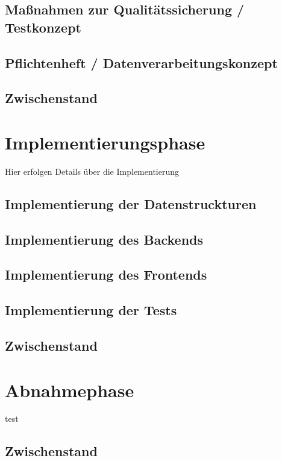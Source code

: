 \documentclass[12pt, xcolor=dvipsnames]{scrartcl}
\begin{document}
\subsection{Maßnahmen zur Qualitätssicherung / Testkonzept}

\subsection{Pflichtenheft / Datenverarbeitungskonzept}

\subsection{Zwischenstand}

\section{Implementierungsphase}

	Hier erfolgen Details über die Implementierung

\subsection{Implementierung der Datenstruckturen}

\subsection{Implementierung des Backends}

\subsection{Implementierung des Frontends}

\subsection{Implementierung der Tests}

\subsection{Zwischenstand}

\section{Abnahmephase}
	test

\subsection{Zwischenstand}
\end{document}
